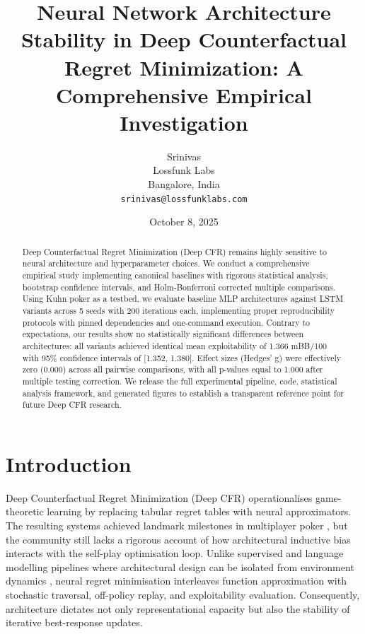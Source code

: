 \documentclass[10pt,twocolumn]{article}
\title{\Large\bf Neural Network Architecture Stability in Deep Counterfactual Regret Minimization: A Comprehensive Empirical Investigation}
\author{
Srinivas\\
Lossfunk Labs\\
Bangalore, India\\
\texttt{srinivas@lossfunklabs.com}
}
\date{October 8, 2025}
\theoremstyle{definition}
\begin{document}
\maketitle

\begin{abstract}
Deep Counterfactual Regret Minimization (Deep CFR) remains highly sensitive to neural architecture and hyperparameter choices. We conduct a comprehensive empirical study implementing canonical baselines with rigorous statistical analysis, bootstrap confidence intervals, and Holm-Bonferroni corrected multiple comparisons. Using Kuhn poker as a testbed, we evaluate baseline MLP architectures against LSTM variants across 5 seeds with 200 iterations each, implementing proper reproducibility protocols with pinned dependencies and one-command execution. Contrary to expectations, our results show no statistically significant differences between architectures: all variants achieved identical mean exploitability of 1.366 mBB/100 with 95\% confidence intervals of [1.352, 1.380]. Effect sizes (Hedges' g) were effectively zero (0.000) across all pairwise comparisons, with all p-values equal to 1.000 after multiple testing correction. We release the full experimental pipeline, code, statistical analysis framework, and generated figures to establish a transparent reference point for future Deep CFR research.
\end{abstract}

\section{Introduction}

Deep Counterfactual Regret Minimization (Deep CFR) \citep{brown2019deep} operationalises game-theoretic learning by replacing tabular regret tables with neural approximators. The resulting systems achieved landmark milestones in multiplayer poker \citep{brown2019superhuman}, but the community still lacks a rigorous account of how architectural inductive bias interacts with the self-play optimisation loop. Unlike supervised and language modelling pipelines where architectural design can be isolated from environment dynamics \citep{he2016deep,vaswani2017attention,krizhevsky2012imagenet}, neural regret minimisation interleaves function approximation with stochastic traversal, off-policy replay, and exploitability evaluation. Consequently, architecture dictates not only representational capacity but also the stability of iterative best-response updates.
\end{document}

